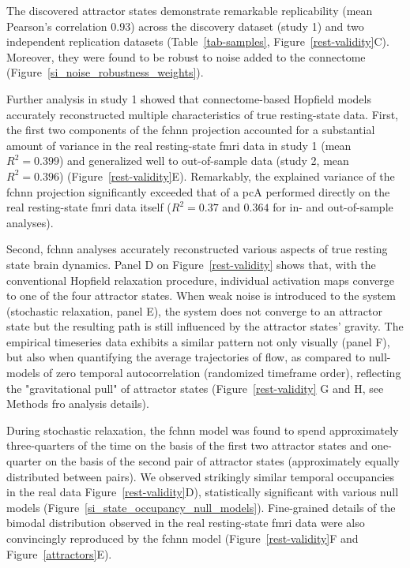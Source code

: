 \documentclass{article}
\begin{document}
The discovered attractor states demonstrate remarkable replicability (mean Pearson's
correlation 0.93) across the discovery dataset (study 1) and two independent replication datasets
(Table~\ref{tab-samples}, Figure~\ref{rest-validity}C). Moreover, they were found to be robust to noise added to the connectome (Figure~\ref{si_noise_robustness_weights}).

Further analysis in study 1 showed that connectome-based Hopfield models accurately reconstructed multiple
characteristics of true resting-state data.
First, the first two components of the \acrshort{fchnn} projection accounted for a substantial amount of variance in the real resting-state \acrshort{fmri} data in study 1 (mean $R^2=0.399$) and generalized well to out-of-sample data (study 2, mean $R^2=0.396$)  (Figure~\ref{rest-validity}E). Remarkably, the explained variance of the \acrshort{fchnn} projection significantly exceeded that of a \acrshort{pc}A performed directly on the real resting-state \acrshort{fmri} data itself ($R^2=0.37$ and $0.364$ for in- and out-of-sample analyses).

Second, \acrshort{fchnn} analyses accurately reconstructed various aspects of true resting state brain dynamics.
Panel D on Figure~\ref{rest-validity} shows that, with the conventional Hopfield relaxation procedure, individual activation maps converge to one of the four attractor states. When weak noise is introduced to the system (stochastic relaxation, panel E), the system does not converge to an attractor state but the resulting path is still influenced by the attractor states' gravity. The empirical timeseries data exhibits a similar pattern not only visually (panel F), but also when quantifying the average trajectories of flow, as compared to null-models of zero temporal autocorrelation (randomized timeframe order), reflecting the "gravitational pull" of attractor states (Figure~\ref{rest-validity} G and H, see Methods fro analysis details).

During stochastic relaxation, the \acrshort{fchnn} model was found to spend approximately three-quarters of the time on the basis of the first two attractor states and one-quarter on the basis of the second pair of attractor states (approximately equally distributed between pairs). We observed strikingly similar temporal occupancies in the real data Figure~\ref{rest-validity}D), statistically significant with various null models (Figure~\ref{si_state_occupancy_null_models}). Fine-grained details of the bimodal distribution observed in the real resting-state \acrshort{fmri} data were also convincingly reproduced by the \acrshort{fchnn} model (Figure~\ref{rest-validity}F and Figure~\ref{attractors}E).
\end{document}
